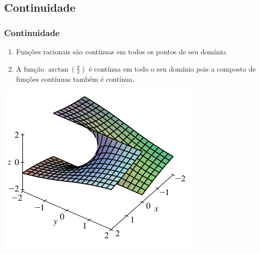 \subsection*{Continuidade}
\begin{frame}[label=limites]
	\frametitle{Continuidade }

		
		

\end{frame}


\begin{frame}[label=limites]
	
\begin{exe} \begin{enumerate}[a]
		\item Funções racionais são contínuas em todos os pontos de seu domínio.
		
		
		\item  A função $\arctan\left(\frac{y}{x}\right)$ é contínua em todo o seu domínio pois a composta de funções contínuas também é contínua.
	\end{enumerate}
\end{exe}

\begin{center}
	\includegraphics[scale=0.6]{figuras/cont1.png}
\end{center}
\end{frame}



